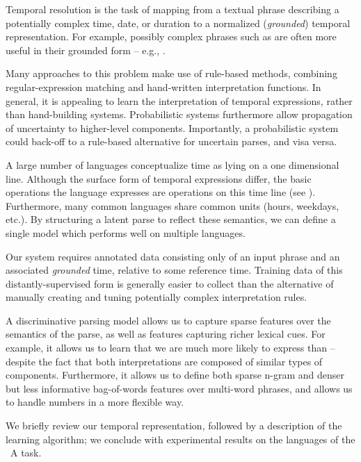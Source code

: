Temporal resolution is the task of mapping from a textual phrase describing
	a potentially complex time, date, or duration to a normalized
	(\textit{grounded}) temporal representation.
For example, possibly complex phrases such as  are
	often more useful in their grounded form -- e.g., .

Many approaches to this problem make use of rule-based methods, combining
  regular-expression matching and hand-written interpretation functions.
In general, it is appealing to learn the interpretation of temporal expressions,
	rather than hand-building systems.
Probabilistic systems furthermore allow propagation of uncertainty
	to higher-level components.
Importantly, a probabilistic system could back-off to a rule-based alternative
  for uncertain parses, and visa versa.

A large number of languages conceptualize time as lying on a one dimensional
  line.
Although the surface form of temporal expressions differ, the basic operations
  the language expresses are operations on this time line (see ).
Furthermore, many common languages share common units (hours, weekdays, etc.).
By structuring a latent parse to reflect these semantics, we can define a single
  model which performs well on multiple languages.

Our system requires annotated data consisting only of an input phrase and
  an associated \textit{grounded} time, relative to some reference time.
Training data of this distantly-supervised form
  is generally easier to collect than the alternative of
  manually creating and tuning potentially complex interpretation rules.

A discriminative parsing model allows us to capture sparse features over
  the semantics of the parse, as well as features capturing richer lexical cues.
For example, it allows us to learn that we are much more likely to
  express  than  -- despite the fact that
  both interpretations are composed of similar types of components.
Furthermore, it allows us to define both sparse n-gram and denser but less
  informative bag-of-words features over multi-word phrases, and allows us
  to handle numbers in a more flexible way.

We briefly review our temporal representation,
	followed by a description of the learning algorithm; 
	we conclude with experimental results on the languages of the
  \tempeval\ A task.




